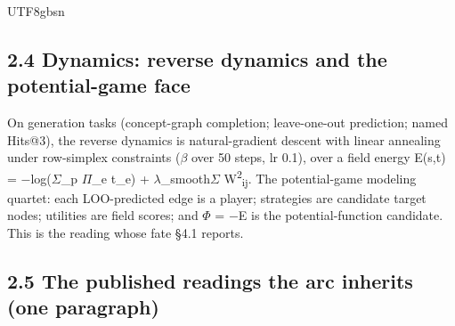 \documentclass[11pt,letterpaper]{article}
\begin{document}
\begin{CJK}{UTF8}{gbsn}
\subsection*{2.4 Dynamics: reverse dynamics and the potential-game face}

On generation tasks (concept-graph completion; leave-one-out prediction; named Hits@3), the reverse dynamics is natural-gradient descent with linear annealing under row-simplex constraints (\ensuremath{\beta} over 50 steps, lr 0.1), over a field energy E(s,t) = \ensuremath{-}log(\ensuremath{\Sigma}\_p \ensuremath{\Pi}\_e t\_e) + \ensuremath{\lambda}\_smooth\textperiodcentered{}\ensuremath{\Sigma} W\textsuperscript{2}\textsubscript{i}\textsubscript{j}. The potential-game modeling quartet: each LOO-predicted edge is a player; strategies are candidate target nodes; utilities are field scores; and \ensuremath{\Phi} = \ensuremath{-}E is the potential-function candidate. This is the reading whose fate \S{}4.1 reports.

\subsection*{2.5 The published readings the arc inherits (one paragraph)}


\end{CJK}
\end{document}
